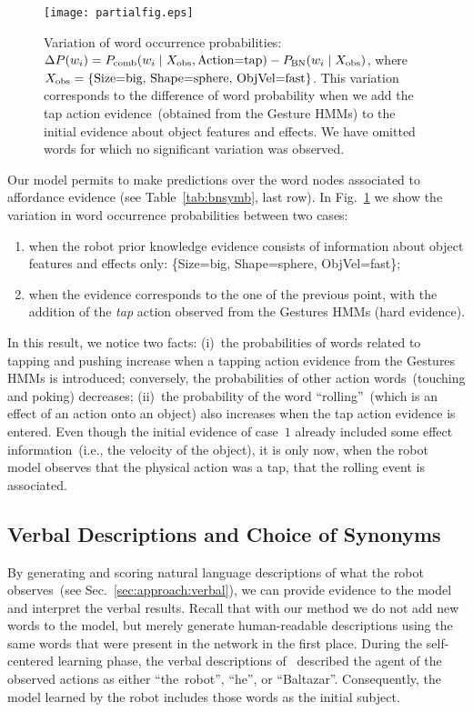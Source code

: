\begin{figure}
\centering
\texttt{[image: partialfig.eps]}
\caption{Variation of word occurrence probabilities:
$\Delta P(w_i) = P_\text{comb}(w_i \mid X_\text{obs}, \text{Action=tap}) - P_{\text{BN}}(w_i \mid X_\text{obs})$, where $X_\text{obs} = \{ \text{Size=big, Shape=sphere, ObjVel=fast} \}$.
This variation corresponds to the difference of word probability when we add the tap action evidence~(obtained from the Gesture \acp{HMM}) to the initial evidence about object features and effects. We have omitted words for which no significant variation was observed.}
\label{fig:probdiff}
\end{figure}

Our model permits to make predictions over the word nodes associated to affordance evidence (see Table~\ref{tab:bnsymb}, last row).
In Fig.~\ref{fig:probdiff} we show the variation in word occurrence probabilities between two cases:
\begin{enumerate}
\item when the robot prior knowledge evidence consists of information about object features and effects only: \{Size=big, Shape=sphere, ObjVel=fast\};

\item when the evidence corresponds to the one of the previous point, with the addition of the \emph{tap} action observed from the Gestures \acp{HMM} (hard evidence).
\end{enumerate}

In this result, we notice two facts: (i)~the probabilities of words related to tapping and pushing increase when a tapping action evidence from the Gestures \acp{HMM} is introduced; conversely, the probabilities of other action words~(touching and poking) decreases; (ii)~the probability of the word ``rolling''~(which is an effect of an action onto an object) also increases when the tap action evidence is entered. Even though the initial evidence of case~$1$ already included some effect information~(i.e., the velocity of the object), it is only now, when the robot model observes that the physical action was a tap, that the rolling event is associated.

\subsection{Verbal Descriptions and Choice of Synonyms}
\label{sec:results:verbal_descriptions}

By generating and scoring natural language descriptions of what the robot observes~(see Sec.~\ref{sec:approach:verbal}), we can provide evidence to the model and interpret the verbal results.
Recall that with our method we do not add new words to the model, but merely generate human-readable descriptions using the same words that were present in the \AffWords{} network in the first place.
During the self-centered learning phase, the verbal descriptions of~\cite{salvi:2012:smcb} described the agent of the observed actions as either ``the~robot'', ``he'', or ``Baltazar''.
Consequently, the \AffWords{} model learned by the robot includes those words as the initial subject.


